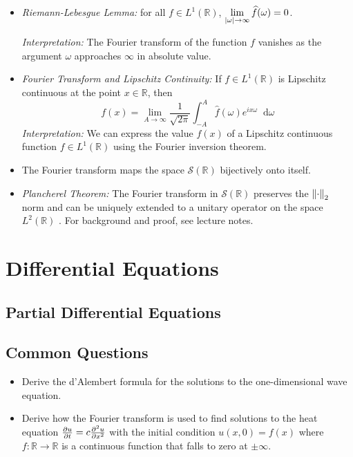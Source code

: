 \documentclass[11pt, a4paper]{article}
\newcommand{\R}{\mathbb{R}} %
\newcommand{\diff}{\mathop{}\!\mathrm{d}} %
\begin{document}
\begin{itemize}
	\item \textit{Riemann-Lebesgue Lemma:} for all $ f \in L^{1}(\R) $, $ \displaystyle{\lim_{\abs{\omega} \to \infty} \widehat{f}(\omega) = 0} $.
	
	\textit{Interpretation:} The Fourier transform of the function $ f $ vanishes as the argument $ \omega $ approaches $ \infty $ in absolute value.
	
	\item \textit{Fourier Transform and Lipschitz Continuity:} If $ f \in L^{1}(\R) $ is Lipschitz continuous at the point $ x \in \R $, then
	\begin{equation*}
		f(x) = \lim_{A \to \infty} \frac{1}{\sqrt{2\pi}} \int_{-A}^{A} \widehat{f}(\omega) e^{ix\omega} \diff \omega
	\end{equation*}
	\textit{Interpretation:} We can express the value $ f(x) $ of a Lipschitz continuous function $ f \in L^{1}(\R) $ using the Fourier inversion theorem.
	
	\item The Fourier transform maps the space $ \mathcal{S}(\R) $ bijectively onto itself.
	
	\item \textit{Plancherel Theorem:} The Fourier transform in $ \mathcal{S}(\R) $ preserves the $ \norm{\cdot}_{2} $ norm and can be uniquely extended to a unitary operator on the space $ L^{2}(\R) $ . For background and proof, see lecture notes.
\end{itemize}


\section{Differential Equations}

\subsection{Partial Differential Equations}

\subsection{Common Questions}
\begin{itemize}
	\item Derive the d'Alembert formula for the solutions to the one-dimensional wave equation.
	\item Derive how the Fourier transform is used to find solutions to the heat equation $ \pdv{u}{t} = c \pdv[2]{u}{x} $ with the initial condition $ u(x, 0) = f(x) $ where $ f: \R \to \R $ is a continuous function that falls to zero at $ \pm \infty $.
\end{itemize}
\end{document}
